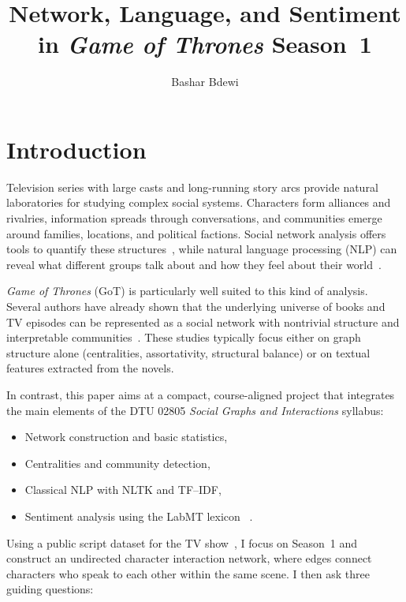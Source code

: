 \documentclass[9pt,twocolumn,twoside]{pnas-new}
\title{Network, Language, and Sentiment in \emph{Game of Thrones} Season~1}
\author[a,1]{Bashar Bdewi}
\affil[a]{Technical University of Denmark (DTU), Department of Applied Mathematics and Computer Science, 2800 Kongens Lyngby, Denmark}
\begin{document}
\maketitle
\thispagestyle{firststyle}


\section*{Introduction}

Television series with large casts and long-running story arcs provide natural laboratories for studying complex social systems. Characters form alliances and rivalries, information spreads through conversations, and communities emerge around families, locations, and political factions. Social network analysis offers tools to quantify these structures~\cite{newman2010,barabasi2016}, while natural language processing (NLP) can reveal what different groups talk about and how they feel about their world~\cite{bird2009}.

\emph{Game of Thrones} (GoT) is particularly well suited to this kind of analysis. Several authors have already shown that the underlying universe of books and TV episodes can be represented as a social network with nontrivial structure and interpretable communities~\cite{beveridge2016,liu2017}. These studies typically focus either on graph structure alone (centralities, assortativity, structural balance) or on textual features extracted from the novels.

In contrast, this paper aims at a compact, course-aligned project that integrates the main elements of the DTU 02805 \emph{Social Graphs and Interactions} syllabus:

\begin{itemize}
    \item Network construction and basic statistics,
    \item Centralities and community detection,
    \item Classical NLP with NLTK and TF--IDF,
    \item Sentiment analysis using the LabMT lexicon ~\cite{dodds2011}.
\end{itemize}

Using a public script dataset for the TV show~\cite{gotkaggle}, I focus on Season~1 and construct an undirected character interaction network, where edges connect characters who speak to each other within the same scene. I then ask three guiding questions:
\end{document}
